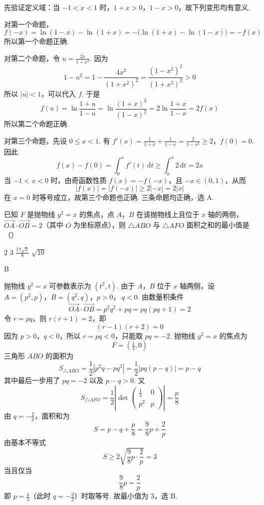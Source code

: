 \begin{solution}
先验证定义域：当 \(-1<x<1\) 时，\(1+x>0\)，\(1-x>0\)，故下列变形均有意义.

对第一个命题，
\[
f(-x)=\ln(1-x)-\ln(1+x)
=-\bigl(\ln(1+x)-\ln(1-x)\bigr)=-f(x)
\]
所以第一个命题正确.

对第二个命题，令 \(u=\frac{2x}{1+x^2}\). 因为
\[
1-u^2=1-\frac{4x^2}{(1+x^2)^2}
=\frac{(1-x^2)^2}{(1+x^2)^2}>0
\]
所以 \(|u|<1\)，可以代入 \(f\). 于是
\[
f(u)=\ln\frac{1+u}{1-u}=\ln\frac{(1+x)^2}{(1-x)^2}=2\ln\frac{1+x}{1-x}=2f(x)
\]
所以第二个命题正确.

对第三个命题，先设 \(0\leqslant x<1\). 有
\(f'(x)=\frac1{1+x}+\frac1{1-x}=\frac2{1-x^2}\geqslant2\)，\(f(0)=0\).
因此
\[
f(x)-f(0)=\int_0^x f'(t)\,\mathrm{d}t\geqslant\int_0^x2\,\mathrm{d}t=2x
\]
当 \(-1<x<0\) 时，由奇函数性质 \(f(x)=-f(-x)\)，且 \(-x\in(0,1)\)，从而
\[
|f(x)|=|f(-x)|\geqslant2|-x|=2|x|
\]
在 \(x=0\) 时等号成立，故第三个命题也正确. 三条命题均正确，选 A.
\end{solution}

\begin{problem}
已知 \(F\) 是抛物线 \(y^{2}=x\) 的焦点，点 \(A\)，\(B\) 在该抛物线上且位于 \(x\) 轴的两侧，\(\overrightarrow{OA} \cdot \overrightarrow{OB}=2\)（其中 \(O\) 为坐标原点），则 \(\triangle ABO\) 与 \(\triangle AFO\) 面积之和的最小值是（\quad）

\choices
    {\(2\)}
    {\(3\)}
    {\(\frac{17\sqrt{2}}{8}\)}
    {\(\sqrt{10}\)}
\end{problem}

\begin{answer}
B
\end{answer}

\begin{solution}
抛物线 \(y^2=x\) 可参数表示为 \((t^2,t)\). 由于 \(A\)，\(B\) 位于 \(x\) 轴两侧，设
\(A=(p^2,p)\)，\(B=(q^2,q)\)，\(p>0\)，\(\ q<0\).
由数量积条件
\[
\overrightarrow{OA}\cdot\overrightarrow{OB}=p^2q^2+pq=pq(pq+1)=2
\]
令 \(r=pq\)，则 \(r(r+1)=2\)，即
\[
(r-1)(r+2)=0
\]
因为 \(p>0\)，\(q<0\)，所以 \(r=pq<0\)，只能取 \(pq=-2\). 抛物线 \(y^2=x\) 的焦点为
\[
F=(\tfrac14,0)
\]
三角形 \(ABO\) 的面积为
\[
S_{\triangle ABO}=\frac12|p^2q-pq^2|
=\frac12|pq(p-q)|=p-q
\]
其中最后一步用了 \(pq=-2\) 以及 \(p-q>0\). 又
\[
S_{\triangle AFO}=\frac12\left|\det\begin{pmatrix}\frac14&0\\p^2&p\end{pmatrix}\right|=\frac p8
\]
由 \(q=-\frac2p\)，面积和为
\[
S=p-q+\frac p8=\frac98p+\frac2p
\]
由基本不等式
\[
S\geqslant2\sqrt{\frac98p\cdot\frac2p}=3
\]
当且仅当
\[
\frac98p=\frac2p
\]
即 \(p=\frac43\)（此时 \(q=-\frac32\)）时取等号. 故最小值为 \(3\)，选 B.
\end{solution}

